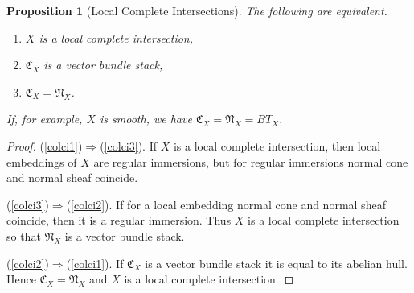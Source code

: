 \documentclass[11pt]{article}
\theoremstyle{plain}
\newtheorem{prop}{Proposition}[section]
\theoremstyle{definition}
\newenvironment{pf}{\begin{proof}}{\end{proof}}
\newcommand{\NN}{{\mathfrak{N}}}
\newcommand{\CC}{{\mathfrak{C}}}
\theoremstyle{plain}
\theoremstyle{definition}
\theoremstyle{remark}
\begin{document}
\begin{prop}[Local Complete Intersections] \label{colci}
The following are equivalent.
\begin{enumerate}
\item \label{colci1} \(X\) is a local complete intersection,
\item \label{colci2} \(\CC_X\) is a vector bundle stack,
\item \label{colci3} \(\CC_X=\NN_X\).
\end{enumerate}
If, for example, \(X\) is smooth, we have \(\CC_X=\NN_X=BT_X\).
\end{prop}
\begin{pf}
(\ref{colci1})\(\Longrightarrow\)(\ref{colci3}).
If \(X\) is a local complete intersection, then local embeddings of \(X\)
are regular immersions, but for regular immersions normal cone and
normal sheaf coincide.

(\ref{colci3})\(\Longrightarrow\)(\ref{colci2}).
If for a local embedding normal cone and normal sheaf coincide, then it is a
regular immersion. Thus \(X\) is a local complete intersection so that
\(\NN_X\) is a vector bundle stack.

(\ref{colci2})\(\Longrightarrow\)(\ref{colci1}).
If \(\CC_X\) is a vector bundle stack it is equal to its abelian hull.
Hence \(\CC_X=\NN_X\) and \(X\) is a local complete intersection.
\end{pf}
\end{document}
